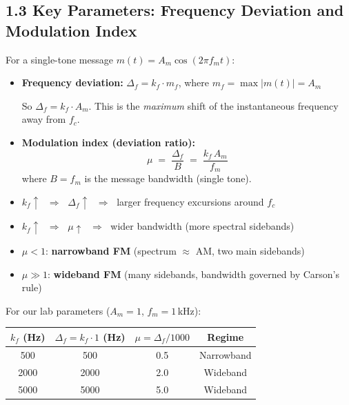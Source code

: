 \documentclass[../../main.tex]{subfiles}
\begin{document}
\vspace{1em}

\subsection{1.3 \; Key Parameters: Frequency Deviation and Modulation Index}

For a single-tone message $m(t) = A_m \cos(2\pi f_m t)$:

\begin{itemize}[leftmargin=1.5em]
  \item \textbf{Frequency deviation:} $\Delta_f = k_f \cdot m_f$, where $m_f = \max|m(t)| = A_m$

  So $\Delta_f = k_f \cdot A_m$. This is the \emph{maximum} shift of the instantaneous frequency away from $f_c$.

  \item \textbf{Modulation index (deviation ratio):}
  \[
    \mu \;=\; \frac{\Delta_f}{B} \;=\; \frac{k_f \, A_m}{f_m}
  \]
  where $B = f_m$ is the message bandwidth (single tone).
\end{itemize}

\begin{KeyBox}
\begin{itemize}[leftmargin=1.5em]
  \item $k_f \uparrow$ $\;\Longrightarrow\;$ $\Delta_f \uparrow$ $\;\Longrightarrow\;$ larger frequency excursions around $f_c$
  \item $k_f \uparrow$ $\;\Longrightarrow\;$ $\mu \uparrow$ $\;\Longrightarrow\;$ wider bandwidth (more spectral sidebands)
  \item $\mu < 1$: \textbf{narrowband FM} (spectrum $\approx$ AM, two main sidebands)
  \item $\mu \gg 1$: \textbf{wideband FM} (many sidebands, bandwidth governed by Carson's rule)
\end{itemize}
\end{KeyBox}

\vspace{0.5em}

For our lab parameters ($A_m = 1$, $f_m = 1$\,kHz):

\begin{center}
\begin{tabular}{cccc}
\toprule
$k_f$ (Hz) & $\Delta_f = k_f \cdot 1$ (Hz) & $\mu = \Delta_f / 1000$ & Regime \\
\midrule
500  & 500  & 0.5 & Narrowband \\
2000 & 2000 & 2.0 & Wideband \\
5000 & 5000 & 5.0 & Wideband \\
\bottomrule
\end{tabular}
\end{center}
\end{document}
